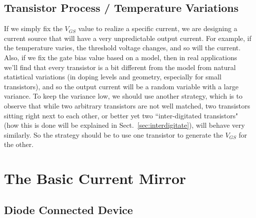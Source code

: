 \subsection{Transistor Process / Temperature Variations}


If we simply fix the $V_{GS}$ value to realize a specific current, we are designing a current source that will have a very unpredictable output current.  For example, if the temperature varies, the threshold voltage changes, and so will the current.  Also, if we fix the gate bias value based on a model, then in real applications we'll find that every transistor is a bit different from the model from natural statistical variations (in doping levels and geometry, especially for small transistors), and so the output current will be a random variable with a large variance.  To keep the variance low, we should use another strategy, which is to observe that while two arbitrary transistors are not well matched, two transistors sitting right next to each other, or better yet two ``inter-digitated transistors" (how this is done will be explained in Sect.~\ref{sec:interdigitate}), will behave very similarly. So the strategy should be to use one transistor to generate the $V_{GS}$ for the other.

 



\section{The Basic Current Mirror}



\subsection{Diode Connected Device}



